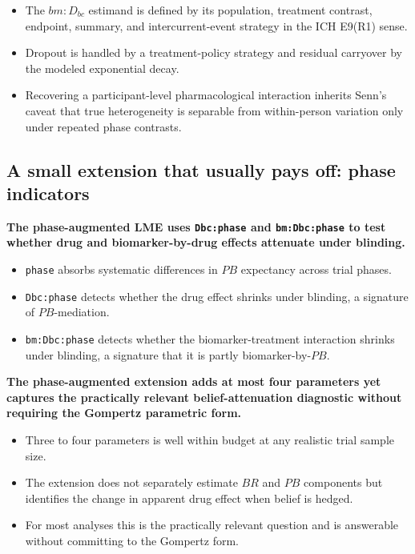 \documentclass[
  11pt,
]{article}
\begin{document}
\begin{itemize}\setlength{\itemsep}{2pt}\setlength{\parskip}{0pt}
\item The $bm{:}D_{bc}$ estimand is defined by its population, treatment contrast, endpoint, summary, and intercurrent-event strategy in the ICH E9(R1) sense.
\item Dropout is handled by a treatment-policy strategy and residual carryover by the modeled exponential decay.
\item Recovering a participant-level pharmacological interaction inherits Senn's caveat that true heterogeneity is separable from within-person variation only under repeated phase contrasts.
\end{itemize}

\subsection{A small extension that usually pays off: phase indicators}\label{a-small-extension-that-usually-pays-off-phase-indicators}

\textbf{The phase-augmented LME uses \texttt{Dbc:phase} and \texttt{bm:Dbc:phase} to test whether drug and biomarker-by-drug effects attenuate under blinding.}

\begin{itemize}\setlength{\itemsep}{2pt}\setlength{\parskip}{0pt}
\item \texttt{phase} absorbs systematic differences in $PB$ expectancy across trial phases.
\item \texttt{Dbc:phase} detects whether the drug effect shrinks under blinding, a signature of $PB$-mediation.
\item \texttt{bm:Dbc:phase} detects whether the biomarker-treatment interaction shrinks under blinding, a signature that it is partly biomarker-by-$PB$.
\end{itemize}

\textbf{The phase-augmented extension adds at most four parameters yet captures the practically relevant belief-attenuation diagnostic without requiring the Gompertz parametric form.}

\begin{itemize}\setlength{\itemsep}{2pt}\setlength{\parskip}{0pt}
\item Three to four parameters is well within budget at any realistic trial sample size.
\item The extension does not separately estimate $BR$ and $PB$ components but identifies the change in apparent drug effect when belief is hedged.
\item For most analyses this is the practically relevant question and is answerable without committing to the Gompertz form.
\end{itemize}
\end{document}

